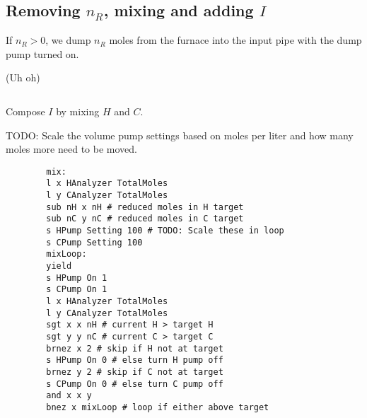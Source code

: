 \documentclass{article}
\begin{document}
\subsection{Removing $n_R$, mixing and adding $I$}

\vspace{1em}
\begin{paracol}{2}
    If $n_R>0$, we dump $n_R$ moles from the furnace into the input pipe
    with the dump pump turned on.

    (Uh oh)

    \switchcolumn
    \begin{verbatim}
    \end{verbatim}
    \switchcolumn*
    \noindent
    Compose $I$ by mixing $H$ and $C$.
    \newline

    \noindent
    {\color{red}
        TODO: Scale the volume pump settings based on moles per liter
        and how many moles more need to be moved.
    }
    \switchcolumn
    \vspace{-1em}
    \begin{verbatim}
        mix:
        l x HAnalyzer TotalMoles
        l y CAnalyzer TotalMoles
        sub nH x nH # reduced moles in H target
        sub nC y nC # reduced moles in C target
        s HPump Setting 100 # TODO: Scale these in loop
        s CPump Setting 100
        mixLoop:
        yield
        s HPump On 1
        s CPump On 1
        l x HAnalyzer TotalMoles
        l y CAnalyzer TotalMoles
        sgt x x nH # current H > target H
        sgt y y nC # current C > target C
        brnez x 2 # skip if H not at target
        s HPump On 0 # else turn H pump off
        brnez y 2 # skip if C not at target
        s CPump On 0 # else turn C pump off
        and x x y
        bnez x mixLoop # loop if either above target
    \end{verbatim}
\end{paracol}
\end{document}
